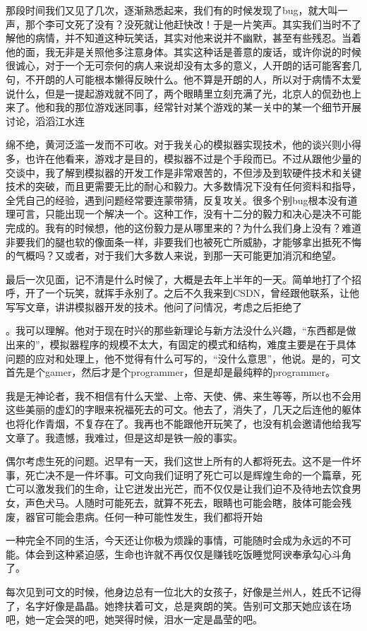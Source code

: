 \documentclass{article}
\begin{document}
那段时间我们又见了几次，逐渐熟悉起来，我们有的时候发现了bug，就大叫一声，那个李可文死了没有？没死就让他赶快改！于是一片笑声。其实我们当时不了解他的病情，并不知道这种玩笑话，其实对他来说并不幽默，甚至有些残忍。当着他的面，我无非是关照他多注意身体。其实这种话是善意的废话，或许你说的时候很诚心，对于一个无可奈何的病人来说却没有太多的意义，人开朗的话可能客套几句，不开朗的人可能根本懒得反映什么。他不算是开朗的人，所以对于病情不太爱说什么，但是一提起游戏就不同了，两个眼睛里立刻充满了光，北京人的侃劲也上来了。他和我的那位游戏迷同事，经常针对某个游戏的某一关中的某一个细节开展讨论，滔滔江水连

\newpage 

绵不绝，黄河泛滥一发而不可收。对于我关心的模拟器实现技术，他的谈兴则小得多，也许在他看来，游戏才是目的，模拟器不过是个手段而已。不过从跟他少量的交谈中，我了解到模拟器的开发工作是非常艰苦的，不但涉及到软硬件技术和关键技术的突破，而且更需要无比的耐心和毅力。大多数情况下没有任何资料和指导，全凭自己的经验，遇到问题经常要连蒙带猜，反复攻关。很多个别bug根本没有道理可言，只能出现一个解决一个。这种工作，没有十二分的毅力和决心是决不可能完成的。我有的时候想，他的这份毅力是从哪里来的？为什么我们身上没有？难道非要我们的腿也软的像面条一样，非要我们也被死亡所威胁，才能够拿出抵死不悔的气概吗？又或者，对于我们大多数人来说，到那一天可能更加消沉和绝望。

最后一次见面，记不清是什么时候了，大概是去年上半年的一天。简单地打了个招呼，开了一个玩笑，就挥手永别了。之后不久我来到CSDN，曾经跟他联系，让他写写文章，讲讲模拟器开发的技术。他问了问情况，考虑之后拒绝了

\newpage 

。我可以理解。他对于现在时兴的那些新理论与新方法没什么兴趣，“东西都是做出来的”，模拟器程序的规模不太大，有固定的模式和结构，难度主要是在于具体问题的应对和处理上，他不觉得有什么可写的，“没什么意思”，他说。是的，可文首先是个gamer，然后才是个programmer，但是却是最纯粹的programmer。

我是无神论者，我不相信有什么天堂、上帝、天使、佛、来生等等，所以也不会用这些美丽的虚幻的字眼来祝福死去的可文。他去了，消失了，几天之后连他的躯体也将化作青烟，不复存在了。我再也不能跟他开玩笑了，也没有机会邀请他给我写文章了。我遗憾，我难过，但是这却是铁一般的事实。

偶尔考虑生死的问题。迟早有一天，我们这世上所有的人都将死去。这不是一件坏事，死亡决不是一件坏事。可文向我们证明了死亡可以是辉煌生命的一个篇章，死亡可以激发我们的生命，让它迸发出光芒，而不仅仅是让我们迫不及待地去饮食男女，声色犬马。人随时可能死去，就算不死去，眼睛也可能会瞎，肢体可能会残废，器官可能会患病。任何一种可能性发生，我们都将开始

\newpage 

一种完全不同的生活，今天还让你极为烦躁的事情，可能随时会成为永远的不可能。体会到这种紧迫感，生命也许就不再仅仅是赚钱吃饭睡觉阿谀奉承勾心斗角了。

每次见到可文的时候，他身边总有一位北大的女孩子，好像是兰州人，姓氏不记得了，名字好像是晶晶。她搀扶着可文，总是爽朗的笑。告别可文那天她应该在场吧，她一定会哭的吧，她哭得时候，泪水一定是晶莹的吧。
\end{document}
